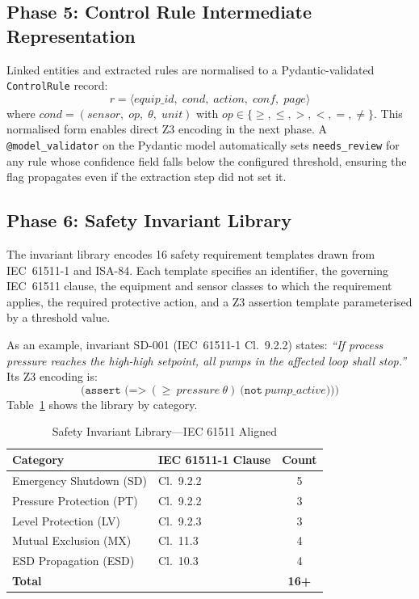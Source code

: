 \documentclass[conference]{IEEEtran}
\begin{document}
\subsection{Phase 5: Control Rule Intermediate Representation}
Linked entities and extracted rules are normalised to a Pydantic-validated
\texttt{ControlRule} record:
\begin{equation}
r = \langle \textit{equip\_id},\; \textit{cond},\; \textit{action},\;
    \textit{conf},\; \textit{page} \rangle
\end{equation}
where $\textit{cond} = (\textit{sensor},\; \textit{op},\; \theta,\;
\textit{unit})$ with $\textit{op} \in \{\geq, \leq, >, <, =, \neq\}$.
This normalised form enables direct Z3 encoding in the next phase.
A \texttt{@model\_validator} on the Pydantic model automatically sets
\texttt{needs\_review} for any rule whose confidence field falls below
the configured threshold, ensuring the flag propagates even if the
extraction step did not set it.

\subsection{Phase 6: Safety Invariant Library}
The invariant library encodes 16 safety requirement templates drawn from
IEC~61511-1 and ISA-84. Each template specifies an identifier, the
governing IEC~61511 clause, the equipment and sensor classes to which the
requirement applies, the required protective action, and a Z3
assertion template parameterised by a threshold value.

As an example, invariant SD-001 (IEC~61511-1 Cl.~9.2.2) states:
\emph{``If process pressure reaches the high-high setpoint, all pumps in
the affected loop shall stop.''} Its Z3 encoding is:
\begin{equation}
\texttt{(assert (=>}\ (\geq\ \textit{pressure}\ \theta)\ \texttt{(not}\ \textit{pump\_active})\texttt{))}
\label{eq:z3}
\end{equation}
Table~\ref{tab:invariants} shows the library by category.

\begin{table}[t]
\caption{Safety Invariant Library---IEC 61511 Aligned}
\label{tab:invariants}
\centering
\small
\begin{tabular}{@{}llc@{}}
\toprule
\textbf{Category} & \textbf{IEC 61511-1 Clause} & \textbf{Count} \\
\midrule
Emergency Shutdown (SD) & Cl.\ 9.2.2  & 5 \\
Pressure Protection (PT) & Cl.\ 9.2.2 & 3 \\
Level Protection (LV)    & Cl.\ 9.2.3 & 3 \\
Mutual Exclusion (MX)    & Cl.\ 11.3  & 4 \\
ESD Propagation (ESD)    & Cl.\ 10.3  & 4 \\
\midrule
\textbf{Total} & & \textbf{16+} \\
\bottomrule
\end{tabular}
\end{table}
\end{document}
